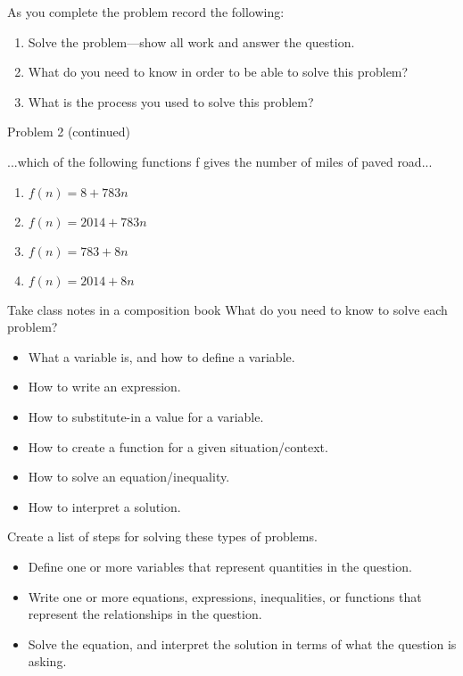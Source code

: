 \documentclass[onlytextwidth]{beamer}
\begin{document}
\begin{frame}{As you complete the problem record the following:}  
  \begin{enumerate}
    \item Solve the problem—show all work and answer the question.
    \item What do you need to know in order to be able to solve this problem?
    \item What is the process you used to solve this problem?
  \end{enumerate} \vspace{1cm}
  Problem 2 (continued) \par 
  ...which of the following functions f gives the number of miles of paved road...
  \begin{enumerate}
    \item $f(n) = 8 + 783n$
    \item $f(n) = 2014 + 783n$
    \item $f(n) = 783 + 8n$
    \item $f(n) = 2014 + 8n$
  \end{enumerate}
  \end{frame}

\begin{frame}{Take class notes in a composition book}
  What do you need to know to solve each problem?
    \begin{itemize}
      \item What a variable is, and how to define a variable.
      \item How to write an expression.
      \item How to substitute-in a value for a variable.
      \item How to create a function for a given situation/context.
      \item How to solve an equation/inequality.
      \item How to interpret a solution.
    \end{itemize}
  Create a list of steps for solving these types of problems.
    \begin{itemize}
      \item Define one or more variables that represent quantities in the question.
      \item Write one or more equations, expressions, inequalities, or functions that represent the relationships in the question.
     \item Solve the equation, and interpret the solution in terms of what the question is asking.
  \end{itemize}
\end{frame}
\end{document}
